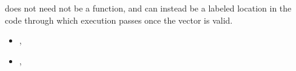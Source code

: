  does not need not be a function,
and can instead be a labeled location in the code through which
execution passes once the vector is valid.

\crossreferences
\begin{itemize}
\item
  , 
\item
  , 
\end{itemize}


